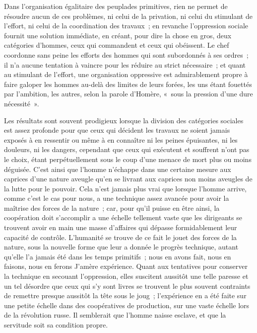 \documentclass[french,twoside]{book} %
\begin{document}
Dans l'organisation égalitaire des peuplades primitives, rien ne permet de résoudre aucun de ces problèmes, ni celui de la privation, ni celui du stimulant de l'effort, ni celui de la coordination des travaux ; en revanche l'oppression sociale fournit une solution immédiate, en créant, pour dire la chose en gros, deux catégories d'hommes, ceux qui commandent et ceux qui obéissent. Le chef coordonne sans peine les efforts des hommes qui sont subordonnés à ses ordres ; il n'a aucune tentation à vaincre pour les réduire au strict nécessaire ; et quant au stimulant de l'effort, une organisation oppressive est admirablement propre à faire galoper les hommes au-delà des limites de leurs forées, les uns étant fouettés par l'ambition, les autres, selon la parole d'Homère, « sous la pression d'une dure nécessité ».\par
Les résultats sont souvent prodigieux lorsque la division des catégories sociales est assez profonde pour que ceux qui décident les travaux ne soient jamais exposés à en ressentir ou même à en connaître ni les peines épuisantes, ni les douleurs, ni les dangers, cependant que ceux qui exécutent et souffrent n'ont pas le choix, étant perpétuellement sous le coup d'une menace de mort plus ou moins déguisée. C'est ainsi que l'homme n'échappe dans une certaine mesure aux caprices d'une nature aveugle qu'en se livrant aux caprices non moins aveugles de la lutte pour le pouvoir. Cela n'est jamais plus vrai que lorsque l'homme arrive, comme c'est le cas pour nous, a une technique assez avancée pour avoir la maîtrise des forces de la nature ; car, pour qu'il puisse en être ainsi, la coopération doit s'accomplir a une échelle tellement vaste que les dirigeants se trouvent avoir en main une masse d'affaires qui dépasse formidablement leur capacité de contrôle. L'humanité se trouve de ce fait le jouet des forces de la nature, sous la nouvelle forme que leur a donnée le progrès technique, autant qu'elle l'a jamais été dans les temps primitifs ; nous en avons fait, nous en faisons, nous en ferons J'amère expérience. Quant aux tentatives pour conserver la technique en secouant l'oppression, elles suscitent aussitôt une telle paresse et un tel désordre que ceux qui s'y sont livres se trouvent le plus souvent contraints de remettre presque aussitôt la tête sous le joug ; l'expérience en a été faite sur une petite échelle dans des coopératives de production, sur une vaste échelle lors de la révolution russe. Il semblerait que l'homme naisse esclave, et que la servitude soit sa condition propre.
\end{document}
